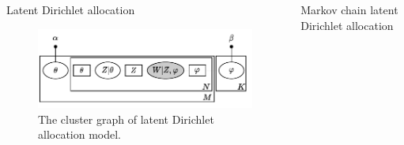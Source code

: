 \documentclass[final]{beamer}
\newlength{\columnheight}
\begin{document}
\begin{frame}[t]
\begin{columns}[T]
\begin{column}{.33\linewidth}
\begin{minipage}[T]{.97\textwidth}
{\begin{block}{Latent Dirichlet allocation}
                        \vspace{-0.5cm}
                        \begin{figure}[t]
                            \centering
                            \includegraphics[width=\linewidth]{figures/base_lda}
                            \caption{The cluster graph of latent Dirichlet allocation model.}
                            \label{fig:base_lda}
                        \end{figure}

                    \end{block}

                }\end{minipage}
        \end{column}



        \begin{column}{.33\linewidth}
            \centering
            \begin{minipage}[T]{.97\textwidth}\parbox[t][\columnheight]{\textwidth}{

                    \begin{block}{Markov chain latent Dirichlet allocation}


\end{block}}
\end{minipage}
\end{column}
\end{columns}
\end{frame}
\end{document}
